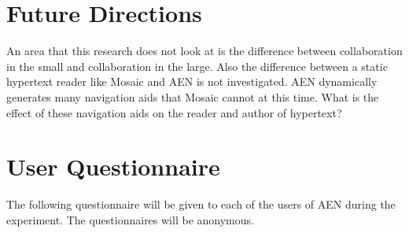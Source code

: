 %
%

\section{Future Directions}
\label{sec:future}

An area that this research does not look at is the difference between
collaboration in the small and collaboration in the large.  Also the
difference between a static hypertext reader like Mosaic and AEN is not
investigated.  AEN dynamically generates many navigation aids that Mosaic
cannot at this time.  What is the effect of these navigation aids on the
reader and author of hypertext?


\appendix
\newpage
\section{User Questionnaire}

The following questionnaire will be given to each of the users of AEN
during the experiment.  The questionnaires will be anonymous.

